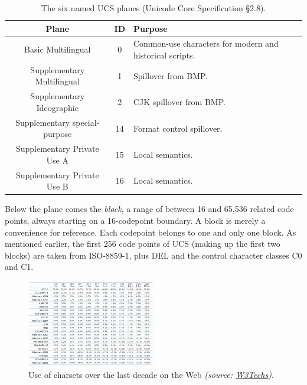 \begin{table}[!htb]
  \begin{center}
    \begin{tabular}{ |c|c|l| }
      \hline
      Plane & ID & Purpose \\
      \hline
      \hline
      Basic Multilingual & 0 & Common-use characters for modern and historical scripts. \\
      \hline
      Supplementary Multilingual & 1 & Spillover from BMP. \\
      \hline
      Supplementary Ideographic & 2 & CJK spillover from BMP. \\
      \hline
      Supplementary special-purpose & 14 & Format control spillover. \\
      \hline
      Supplementary Private Use A & 15 & Local semantics. \\
      \hline
      Supplementary Private Use B & 16 & Local semantics. \\
      \hline
    \end{tabular}
  \end{center}
  \caption[The six named UCS planes.]{The six named UCS planes (Unicode Core Specification §2.8\cite{unicode}).}
  \label{table:ucsplanes}
\end{table}

Below the plane comes the \textit{block}, a range of between 16 and 65,536 related
code points, always starting on a 16-codepoint boundary. A block is merely a
convenience for reference. Each codepoint belongs to one and only one block.
As mentioned earlier, the first 256 code points of UCS (making up the first two
blocks) are taken from ISO-8859-1, plus DEL and the control character classes
C0 and C1.
\begin{figure}[!htb]
\centering
\includegraphics[width=0.5\textwidth]{media/yearly-charsets.png}
\caption{Use of charsets over the last decade on the Web \textit{(source: \href{https://w3techs.com/technologies/history\_overview/character\_encoding/ms/y}{W3Techs})}.}
\label{fig:charsetuse}
\end{figure}


